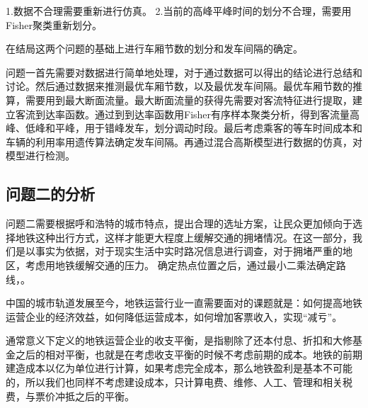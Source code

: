 \documentclass[12pt,a4paper]{mcmthesis}
\begin{document}
    1.数据不合理需要重新进行仿真。
    2.当前的高峰平峰时间的划分不合理，需要用Fisher聚类重新划分。

    在结局这两个问题的基础上进行车厢节数的划分和发车间隔的确定。




        {问题一首先需要对数据进行简单地处理，对于通过数据可以得出的结论进行总结和讨论。然后通过数据来推测最优车厢节数，以及最优发车间隔。最优车厢节数的推算，需要用到最大断面流量。最大断面流量的获得先需要对客流特征进行提取，建立客流到达率函数。通过到到达率函数用Fisher有序样本聚类分析，得到客流量高峰、低峰和平峰，用于错峰发车，划分调动时段。最后考虑乘客的等车时间成本和车辆的利用率用遗传算法确定发车间隔。再通过混合高斯模型进行数据的仿真，对模型进行检测。}

    \subsection{问题二的分析}
    问题二需要根据呼和浩特的城市特点，提出合理的选址方案，让民众更加倾向于选择地铁这种出行方式，这样才能更大程度上缓解交通的拥堵情况。在这一部分，我们是以事实为依据，对于现实生活中实时路况信息进行调查，对于拥堵严重的地区，考虑用地铁缓解交通的压力。
    确定热点位置之后，通过最小二乘法确定路线，。
    
    中国的城市轨道发展至今，地铁运营行业一直需要面对的课题就是：如何提高地铁运营企业的经济效益，如何降低运营成本，如何增加客票收入，实现“减亏”。

    通常意义下定义的地铁运营企业的收支平衡，是指剔除了还本付息、折扣和大修基金之后的相对平衡，也就是在考虑收支平衡的时候不考虑前期的成本。地铁的前期建造成本以亿为单位进行计算，如果考虑完全成本，那么地铁盈利是基本不可能的，所以我们也同样不考虑建设成本，只计算电费、维修、人工、管理和相关税费，与票价冲抵之后的平衡。
\end{document}
